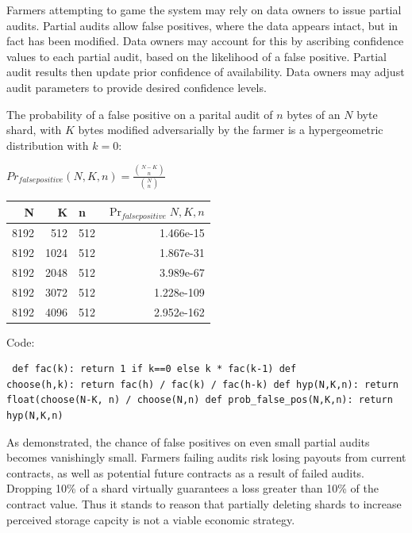 \documentclass[a4paper,10pt]{article} \usepackage[utf8]{inputenc}
\begin{document}
Farmers attempting to game the system may rely on data owners to issue partial
audits. Partial audits allow false positives, where the data appears intact, but
in fact has been modified. Data owners may account for this by ascribing
confidence values to each partial audit, based on the likelihood of a false
positive. Partial audit results then update prior confidence of availability.
Data owners may adjust audit parameters to provide desired confidence levels.

The probability of a false positive on a parital audit of $ n $ bytes of an $ N
$ byte shard, with $ K $ bytes modified adversarially by the farmer is a
hypergeometric distribution with $ k = 0 $:

{\centering $Pr_{false positive}(N,K,n) = \displaystyle \frac{{N-K \choose n}}
{{N \choose n}}$ \\}

\begin{table}[hbt!] \begin{center} \begin{tabular}{r r l r} N & K & n &
$\Pr_{falsepositive}{N,K,n}$\\ \hline 8192 & 512  & 512 & 1.466e-15\\ \hline
8192 & 1024 & 512 & 1.867e-31\\ \hline 8192 & 2048 & 512 & 3.989e-67\\ \hline
8192 & 3072 & 512 & 1.228e-109\\ \hline 8192 & 4096 & 512 & 2.952e-162\\
\end{tabular} \end{center} \end{table}

Code: \begin{lstlisting} def fac(k): return 1 if k==0 else k * fac(k-1) def
choose(h,k): return fac(h) / fac(k) / fac(h-k) def hyp(N,K,n): return
float(choose(N-K, n) / choose(N,n) def prob_false_pos(N,K,n): return hyp(N,K,n)
\end{lstlisting}

As demonstrated, the chance of false positives on even small partial audits
becomes vanishingly small. Farmers failing audits risk losing payouts from
current contracts, as well as potential future contracts as a result of failed
audits. Dropping 10\% of a shard virtually guarantees a loss greater than 10\%
of the contract value. Thus it stands to reason that partially deleting shards
to increase perceived storage capcity is not a viable economic strategy.
\end{document}
